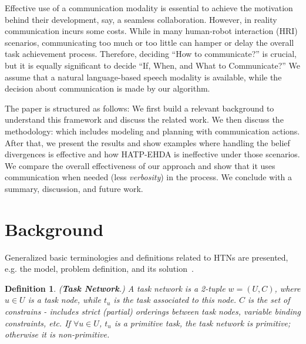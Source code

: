 \documentclass[letterpaper]{article} %
\newtheorem{definition}{Definition}
\begin{document}
Effective use of a communication modality is essential to achieve the motivation behind their development, say, a seamless collaboration. However, in reality communication incurs some costs. 
While in many human-robot interaction (HRI) scenarios, communicating too much or too little can hamper or delay the overall task achievement process. 
Therefore, deciding ``How to communicate?'' is crucial, but it is equally significant to decide ``If, When, and What to Communicate?'' 
We assume that a natural language-based speech modality is available, while 
the decision about communication is made by our algorithm. 
%

The paper is structured as follows: We first build a relevant background to understand this framework and discuss the related work. We then discuss the methodology: which includes modeling and planning with communication actions. 
After that, we present the results and show examples where handling the belief divergences is effective and how HATP-EHDA is ineffective under those scenarios. We compare the overall effectiveness of our approach and show that it uses communication when needed (less \textit{verbosity}) in the process. 
We conclude with a summary, discussion, and future work.

\section{Background}

Generalized basic terminologies and definitions related to HTNs are presented, e.g. the model, problem definition, and its solution~\cite{naubooks0014222}.  
\begin{definition} 
(\textbf{Task Network}.) {A task network is a 2-tuple $w=(U,C)$, where $u\in U$ is a task node, while $t_u$ is the task associated to this node. $C$ is the set of constrains - includes strict (partial) orderings between task nodes, variable binding constraints, etc. If $\forall u \in U$, $t_u$ is a primitive task, the task network is primitive; otherwise it is non-primitive.}  
\end{definition}
\end{document}

